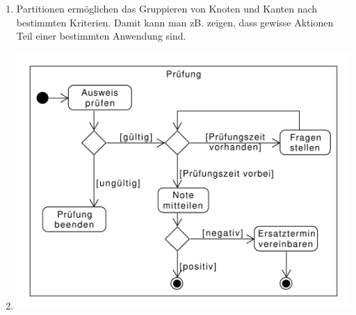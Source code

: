 \documentclass[a4paper, 12pt, margins=2.5cm]{homework}
\begin{document}
\begin{solution}
\begin{enumerate}[label=\alph*)]
      \item Partitionen ermöglichen das Gruppieren von Knoten und Kanten nach
            bestimmten Kriterien. Damit kann man zB. zeigen, dass gewisse Aktionen
            Teil einer bestimmten Anwendung sind.
\newpage
      \item \hfill
        \begin{center}
           \includegraphics[scale=0.7]{Aufgabe1d.pdf}
         \end{center} 
    \end{enumerate}
  \end{solution}
  
\end{document}
